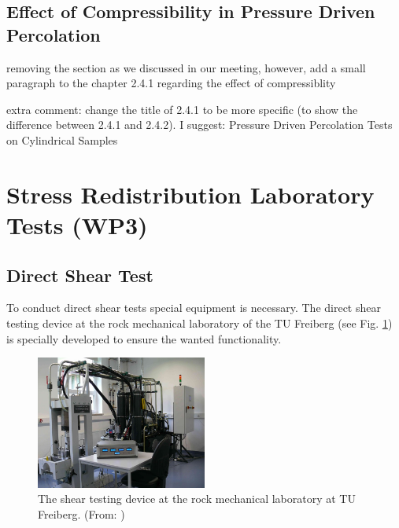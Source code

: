 \subsection{Effect of Compressibility in Pressure Driven Percolation}

removing the section as we discussed in our meeting, however, add a small paragraph to the chapter 2.4.1 regarding the effect of compressiblity

extra comment: change the title of 2.4.1 to be more specific (to show the difference between 2.4.1 and 2.4.2). I suggest: Pressure Driven Percolation Tests on Cylindrical Samples

\section{Stress Redistribution Laboratory Tests (WP3)}
\subsection{Direct Shear Test}
To conduct direct shear tests special equipment is necessary. The direct shear testing device at the rock mechanical laboratory of the TU Freiberg (see Fig. \ref{fig:ExpCNLShearMachine}) is specially developed to ensure the wanted functionality.\\

\begin{figure}[!ht]
\begin{center}
\includegraphics[width=0.5\textwidth]{./figures/ExpShearMachine.jpg}
\end{center}
\caption{The shear testing device at the rock mechanical laboratory at TU Freiberg. (From: \cite{Konietzky2012})}
\label{fig:ExpCNLShearMachine}
\end{figure}

